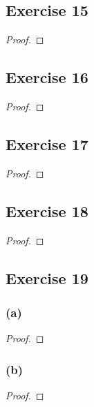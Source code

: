 \documentclass[14pt]{extarticle}
\begin{document}
\subsection{Exercise 15}

\begin{proof}

\end{proof}

\subsection{Exercise 16}

\begin{proof}

\end{proof}

\subsection{Exercise 17}

\begin{proof}

\end{proof}

\subsection{Exercise 18}

\begin{proof}

\end{proof}

\subsection{Exercise 19}

\subsubsection{(a)}

\begin{proof}

\end{proof}

\subsubsection{(b)}

\begin{proof}

\end{proof}
\end{document}
